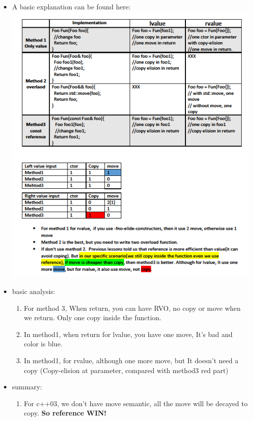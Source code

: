 \documentclass[a4paper,12pt,twoside]{book}
\begin{document}
\begin{itemize}
\item A basic explanation can be found here: \\
\includegraphics[scale=1.0]{pics/value1.png}
\item basic analysis:
\begin{enumerate}
	
	\item For method 3, When return, you can have RVO, no copy or move when we return. Only one copy inside the function.
	
	\item In method1, when return for lvalue, you have one move, It's bad and color is blue.
	
	\item In method1, for rvalue, although one more move, but It doesn't need a copy (Copy-elision at parameter, compared with method3 red part)
\end{enumerate}

\item summary:
\begin{enumerate}
	\item For c++03, we don't have move semantic, all the move will be decayed to copy. \textbf{So reference WIN!}
	

\end{enumerate}
\end{itemize}
\end{document}

